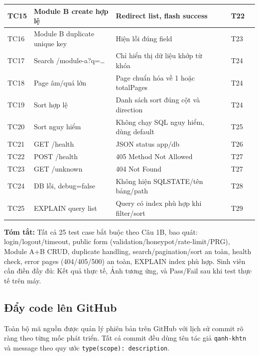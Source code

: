 \begin{longtable}{|p{0.8cm}|p{2cm}|p{2cm}|p{2cm}|p{1.2cm}|p{0.5cm}|}
TC15 & Module B create hợp lệ & Redirect list, flash success &  & T22 &  \\
\hline

TC16 & Module B duplicate unique key & Hiện lỗi đúng field &  & T23 &  \\
\hline

TC17 & Search /module-a?q=\ldots & Chỉ hiển thị dữ liệu khớp từ khóa &  & T24 &  \\
\hline

TC18 & Page âm/quá lớn & Page chuẩn hóa về 1 hoặc totalPages &  & T24 &  \\
\hline

TC19 & Sort hợp lệ & Danh sách sort đúng cột và direction &  & T24 &  \\
\hline

TC20 & Sort nguy hiểm & Không chạy SQL nguy hiểm, dùng default &  & T25 &  \\
\hline

TC21 & GET /health & JSON status app/db &  & T26 &  \\
\hline

TC22 & POST /health & 405 Method Not Allowed &  & T27 &  \\
\hline

TC23 & GET /unknown & 404 Not Found &  & T27 &  \\
\hline

TC24 & DB lỗi, debug=false & Không hiện SQLSTATE/tên bảng/path &  & T28 &  \\
\hline

TC25 & EXPLAIN query list & Query có index phù hợp khi filter/sort &  & T29 &  \\
\hline

\end{longtable}

\textbf{Tóm tắt:} Tất cả 25 test case bắt buộc theo Câu 1B, bao quát: login/logout/timeout, public form (validation/honeypot/rate-limit/PRG), Module A+B CRUD, duplicate handling, search/pagination/sort an toàn, health check, error pages (404/405/500) an toàn, EXPLAIN index phù hợp. Sinh viên cần điền đầy đủ: Kết quả thực tế, Ảnh tương ứng, và Pass/Fail sau khi test thực tế trên máy.

\subsection{Đẩy code lên GitHub}

Toàn bộ mã nguồn được quản lý phiên bản trên GitHub với lịch sử commit rõ ràng theo từng mốc phát triển. Tất cả commit đều dùng tên tác giả \texttt{qanh-khtn} và message theo quy ước \texttt{type(scope): description}.

